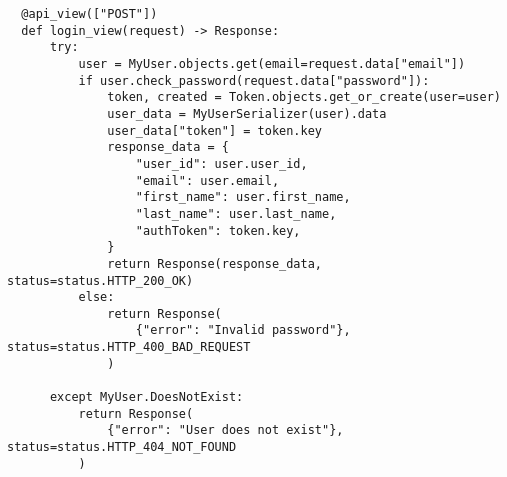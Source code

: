 \begin{verbatim}
  @api_view(["POST"])
  def login_view(request) -> Response:
      try:
          user = MyUser.objects.get(email=request.data["email"])
          if user.check_password(request.data["password"]):
              token, created = Token.objects.get_or_create(user=user)
              user_data = MyUserSerializer(user).data
              user_data["token"] = token.key
              response_data = {
                  "user_id": user.user_id,
                  "email": user.email,
                  "first_name": user.first_name,
                  "last_name": user.last_name,
                  "authToken": token.key,
              }
              return Response(response_data, status=status.HTTP_200_OK)
          else:
              return Response(
                  {"error": "Invalid password"}, status=status.HTTP_400_BAD_REQUEST
              )
  
      except MyUser.DoesNotExist:
          return Response(
              {"error": "User does not exist"}, status=status.HTTP_404_NOT_FOUND
          )
\end{verbatim}


